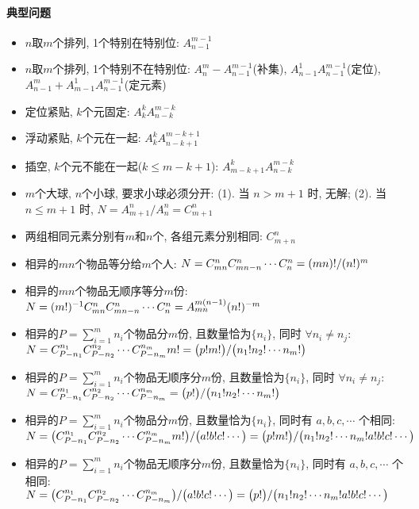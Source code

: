 \paragraph{典型问题}
\begin{itemize}
\item $n$取$m$个排列, 1个特别在特别位: $A^{m-1}_{n-1}$
\item $n$取$m$个排列, 1个特别不在特别位: $A^{m}_{n} - A^{m-1}_{n-1}$(补集), $A^{1}_{n-1}A^{m-1}_{n-1}$(定位), $A^{m}_{n-1} + A^{1}_{m-1}A^{m-1}_{n-1}$(定元素)
\item 定位紧贴, $k$个元固定: $A^{k}_{k}A^{m-k}_{n-k}$
\item 浮动紧贴, $k$个元在一起: $A^{k}_{k}A^{m-k+1}_{n-k+1}$
\item 插空, $k$个元不能在一起($k \leq m - k + 1$): $A^{k}_{m-k+1}A^{m-k}_{n-k}$
\item $m$个大球, $n$个小球, 要求小球必须分开: (1). 当 $n>m+1$ 时, 无解; (2). 当 $n \leq m+1$ 时, $N = A^{n}_{m+1} / A^n_n = C^n_{m+1}$
\item 两组相同元素分别有$m$和$n$个, 各组元素分别相同: $C^n_{m+n}$
\item 相异的$mn$个物品等分给$m$个人: $N = C^n_{mn} \* C^n_{mn-n} \cdots C^n_{n} = (mn)! / (n!)^m$
\item 相异的$mn$个物品无顺序等分$m$份: $N = (m!)^{-1} \* C^n_{mn} \* C^n_{mn-n} \cdots C^n_{n} = A^{m(n-1)}_{mn} \* (n!)^{-m}$
\item 相异的$P = \sum^m_{i = 1} n_i$个物品分$m$份, 且数量恰为$\{n_i\}$, 同时 $\forall n_i \ne n_j$: $N = C^{n_1}_{P-n_1} \* C^{n_2}_{P-n_2} \cdots C^{n_m}_{P-n_m} \* m! = \bigl( p!m! \bigr)/\bigl( n_1! \* n_2! \cdots n_m! \bigr)$
\item 相异的$P = \sum^m_{i = 1} n_i$个物品无顺序分$m$份, 且数量恰为$\{n_i\}$, 同时 $\forall n_i \ne n_j$: $N = C^{n_1}_{P-n_1} \* C^{n_2}_{P-n_2} \cdots C^{n_m}_{P-n_m} = \bigl( p! \bigr)/\bigl( n_1! \* n_2! \cdots n_m! \bigr)$
\item 相异的$P = \sum^m_{i = 1} n_i$个物品分$m$份, 且数量恰为$\{n_i\}$, 同时有 $a, b, c, \cdots$ 个相同: $N = \bigl( C^{n_1}_{P-n_1} \* C^{n_2}_{P-n_2} \cdots C^{n_m}_{P-n_m} \* m! \bigr)/\bigl( a! \* b! \* c! \cdots \bigr) = \bigl( p! \* m! \bigr)/\bigl( n_1! \* n_2! \cdots n_m! \* a! \* b! \* c! \cdots \bigr)$
\item 相异的$P = \sum^m_{i = 1} n_i$个物品无顺序分$m$份, 且数量恰为$\{n_i\}$, 同时有 $a, b, c, \cdots$ 个相同: $N = \bigl( C^{n_1}_{P-n_1} \* C^{n_2}_{P-n_2} \cdots C^{n_m}_{P-n_m} \bigr)/\bigl( a! \* b! \* c! \cdots \bigr) = \bigl( p! \bigr)/\bigl( n_1! \* n_2! \cdots n_m! \* a! \* b! \* c! \cdots \bigr)$
\end{itemize}
